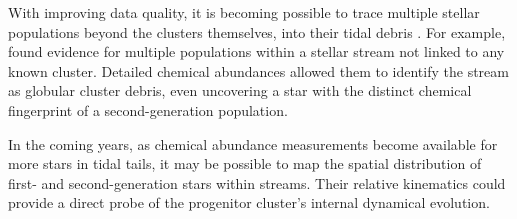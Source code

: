         With improving data quality, it is becoming possible to trace multiple stellar populations beyond the clusters themselves, into their tidal debris \citep{2022MNRAS.510.3727P}. For example, \citet{2024MNRAS.529.2413U} found evidence for multiple populations within a stellar stream not linked to any known cluster. Detailed chemical abundances allowed them to identify the stream as globular cluster debris, even uncovering a star with the distinct chemical fingerprint of a second-generation population.

        In the coming years, as chemical abundance measurements become available for more stars in tidal tails, it may be possible to map the spatial distribution of first- and second-generation stars within streams. Their relative kinematics could provide a direct probe of the progenitor cluster's internal dynamical evolution.
